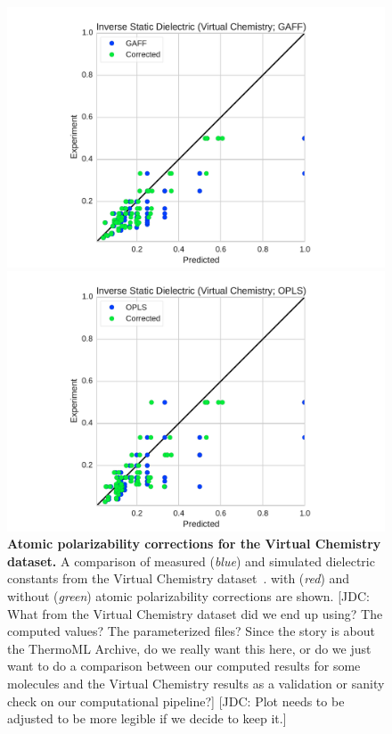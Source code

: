 \documentclass[aps,pre,twocolumn,nofootinbib,superscriptaddress,linenumbers]{revtex4-1}
\begin{document}
\begin{figure}

\includegraphics[width=\columnwidth]{./figures/dielectric_virtual_chemistry_gaff.pdf}

\includegraphics[width=\columnwidth]{./figures/dielectric_virtual_chemistry_opls.pdf}

\caption{{\bf Atomic polarizability corrections for the Virtual Chemistry dataset.}
A comparison of measured (\emph{blue}) and simulated dielectric constants from the Virtual Chemistry dataset~\cite{caleman2011force, van2012gromacs}.   with (\emph{red}) and without (\emph{green}) atomic polarizability corrections are shown.
{\color{red}[JDC: What from the Virtual Chemistry dataset did we end up using? The computed values? The parameterized files? Since the story is about the ThermoML Archive, do we really want this here, or do we just want to do a comparison between our computed results for some molecules and the Virtual Chemistry results as a validation or sanity check on our computational pipeline?]}
{\color{red}[JDC: Plot needs to be adjusted to be more legible if we decide to keep it.]}
}
\label{figure:VirtualChemistry}
\end{figure}
\end{document}

